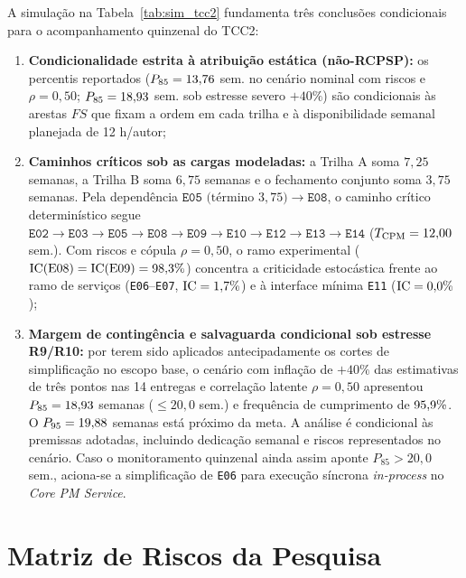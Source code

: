 \documentclass[12pt,openany,oneside,a4paper,english,brazilian,sumario=tradicional]{abntex2}
\newcommand{\IC}{\mathrm{IC}}
\begin{document}
A simulação na Tabela~\ref{tab:sim_tcc2} fundamenta três conclusões condicionais para o acompanhamento quinzenal do TCC2:
\begin{enumerate}
  \item \textbf{Condicionalidade estrita à atribuição estática (não-RCPSP):} os percentis reportados ($P_{85}=13{,}76{}$ sem. no cenário nominal com riscos e $\rho=0{,}50$; $P_{85}=18{,}93{}$ sem. sob estresse severo $+40\%$) são condicionais às arestas $FS$ que fixam a ordem em cada trilha e à disponibilidade semanal planejada de 12 h/autor;
  \item \textbf{Caminhos críticos sob as cargas modeladas:} a Trilha A soma $7{,}25$ semanas, a Trilha B soma $6{,}75$ semanas e o fechamento conjunto soma $3{,}75$ semanas. Pela dependência $\texttt{E05}\text{ (término }3{,}75\text{)} \rightarrow \texttt{E08}$, o caminho crítico determinístico segue $\texttt{E02}\rightarrow\texttt{E03}\rightarrow\texttt{E05}\rightarrow\texttt{E08}\rightarrow\texttt{E09}\rightarrow\texttt{E10}\rightarrow\texttt{E12}\rightarrow\texttt{E13}\rightarrow\texttt{E14}$ ($T_{\mathrm{CPM}} = 12{,}00{}$ sem.). Com riscos e cópula $\rho=0{,}50$, o ramo experimental ($\IC(\text{E08})=\IC(\text{E09})=\tccDoisRiscosICEOito{}\%$) concentra a criticidade estocástica frente ao ramo de serviços (\texttt{E06}--\texttt{E07}, $\IC=\tccDoisRiscosICESeis{}\%$) e à interface mínima \texttt{E11} ($\IC=\tccDoisRiscosICEOnze{}\%$);
  \item \textbf{Margem de contingência e salvaguarda condicional sob estresse R9/R10:} por terem sido aplicados antecipadamente os cortes de simplificação no escopo base, o cenário com inflação de $+40\%$ das estimativas de três pontos nas 14 entregas e correlação latente $\rho=0{,}50$ apresentou $P_{85} = 18{,}93{}$ semanas ($\le 20{,}0$ sem.) e frequência de cumprimento de $95{,}9{}\%$. O $P_{95}=19{,}88{}$ semanas está próximo da meta. A análise é condicional às premissas adotadas, incluindo dedicação semanal e riscos representados no cenário. Caso o monitoramento quinzenal ainda assim aponte $P_{85} > 20{,}0$ sem., aciona-se a simplificação de \texttt{E06} para execução síncrona \textit{in-process} no \textit{Core PM Service}.
\end{enumerate}

\section{Matriz de Riscos da Pesquisa}
\end{document}
